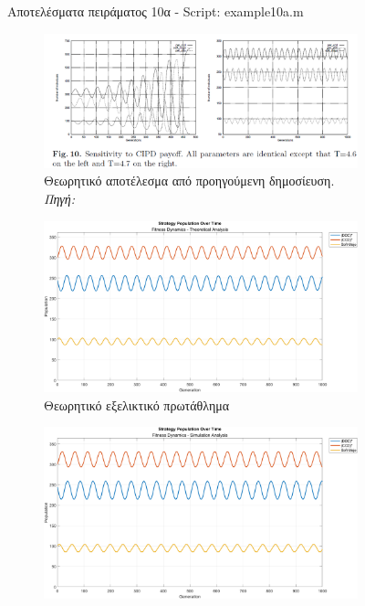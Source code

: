 \documentclass[12pt]{report}
\begin{document}
\begin{figure}[htbp]
\begin{subfigure}[b]{0.5\linewidth}
    \end{subfigure}

    \caption{Αποτελέσματα πειράματος 10α - \foreignlanguage{english}{Script: example10a.m}}
    \label{fig:fig_fit_10a}
\end{figure}

\begin{figure}[htbp]
    \centering

    \begin{subfigure}[b]{0.5\linewidth}
        \centering
        \includegraphics[width=\linewidth]{Figures Fitness Dynamics/10.png}
        \caption{Θεωρητικό αποτέλεσμα από προηγούμενη δημοσίευση. \textit{Πηγή:} \protect\cite{mathieu1999}}
    \end{subfigure}
    \hfill
    \begin{subfigure}[b]{0.5\linewidth}
        \centering
        \includegraphics[width=\linewidth]{Figures Fitness Dynamics/example10b.png}
        \caption{Θεωρητικό εξελικτικό πρωτάθλημα}
        \label{fig:fig_fit_10b_b}
    \end{subfigure}
    \hfill
    \begin{subfigure}[b]{0.5\linewidth}
        \centering
        \includegraphics[width=\linewidth]{Figures Fitness Dynamics/example10b-sim.png}

\end{subfigure}
\end{figure}
\end{document}
